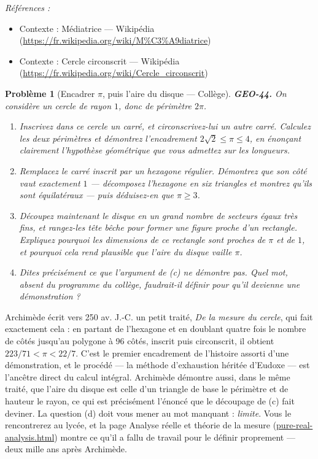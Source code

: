\documentclass[11pt]{article}
\newtheorem{problem}{Problème}
\newenvironment{refs}{\par\small\noindent\emph{Références :}\begin{itemize}\setlength\itemsep{0pt}}{\end{itemize}\normalsize}
\begin{document}
\begin{refs}
\item Contexte : Médiatrice --- Wikipédia (\url{https://fr.wikipedia.org/wiki/M%C3%A9diatrice})
\item Contexte : Cercle circonscrit --- Wikipédia (\url{https://fr.wikipedia.org/wiki/Cercle_circonscrit})
\end{refs}

\bigskip

\begin{problem}[{Encadrer $\pi$, puis l'aire du disque --- Collège}]
\textbf{GEO-44.} On considère un cercle de rayon $ 1 $, donc de périmètre $ 2\pi $.
\begin{enumerate}
\item[(a)] Inscrivez dans ce cercle un carré, et circonscrivez-lui un autre carré. Calculez les deux
périmètres et démontrez l'encadrement $ 2\sqrt{2} \le \pi \le 4 $, en énonçant clairement
l'hypothèse géométrique que vous admettez sur les longueurs.
\item[(b)] Remplacez le carré inscrit par un hexagone régulier. Démontrez que son côté vaut exactement
$ 1 $ --- décomposez l'hexagone en six triangles et montrez qu'ils sont équilatéraux --- puis
déduisez-en que $ \pi \ge 3 $.
\item[(c)] Découpez maintenant le disque en un grand nombre de secteurs égaux très fins, et rangez-les tête
bêche pour former une figure proche d'un rectangle. Expliquez pourquoi les dimensions de ce
\og{} rectangle \fg{} sont proches de $ \pi $ et de $ 1 $, et pourquoi cela rend plausible que l'aire du
disque vaille $ \pi $.
\item[(d)] Dites précisément ce que l'argument de (c) ne démontre pas. Quel mot, absent du programme du
collège, faudrait-il définir pour qu'il devienne une démonstration ?
\end{enumerate}

\end{problem}

\noindent Archimède écrit vers 250 av. J.-C. un petit traité, \textit{De la mesure du cercle},
qui fait exactement cela : en partant de l'hexagone et en doublant quatre fois le nombre de côtés
jusqu'au polygone à 96 côtés, inscrit puis circonscrit, il obtient $ 223/71 < \pi < 22/7 $.
C'est le premier encadrement de l'histoire assorti d'une démonstration, et le procédé --- la méthode
d'exhaustion héritée d'Eudoxe --- est l'ancêtre direct du calcul intégral. Archimède démontre aussi, dans
le même traité, que l'aire du disque est celle d'un triangle de base le périmètre et de hauteur le
rayon, ce qui est précisément l'énoncé que le découpage de (c) fait deviner. La question (d) doit vous
mener au mot manquant : \textit{limite}. Vous le rencontrerez au lycée, et la page
Analyse réelle et théorie de la mesure (\url{pure-real-analysis.html}) montre ce qu'il a fallu de travail pour le
définir proprement --- deux mille ans après Archimède.
\end{document}
